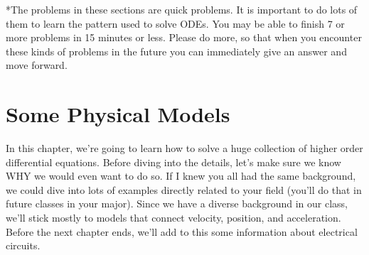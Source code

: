 *The problems in these sections are quick problems. It is important to do lots of them to learn the pattern used to solve ODEs. You may be able to finish 7 or more problems in 15 minutes or less.  Please do more, so that when you encounter these kinds of problems in the future you can immediately give an answer and move forward.


\section{Some Physical Models}
In this chapter, we're going to learn how to solve a huge collection of higher order differential equations.  Before diving into the details, let's make sure we know WHY we would even want to do so. If I knew you all had the same background, we could dive into lots of examples directly related to your field (you'll do that in future classes in your major).  Since we have a diverse background in our class, we'll stick mostly to models that connect velocity, position, and acceleration.  Before the next chapter ends, we'll add to this some information about electrical circuits.


